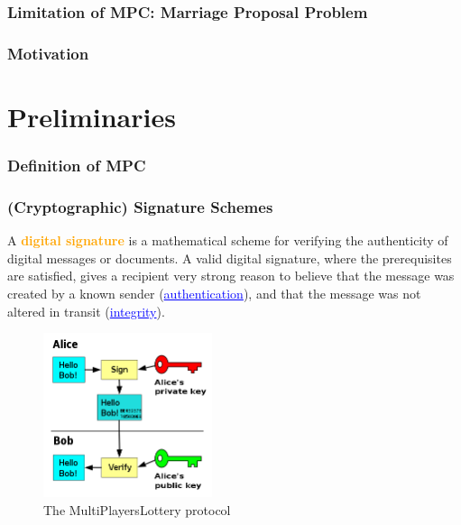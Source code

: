 \documentclass{beamer}
\begin{document}
\begin{frame}\frametitle{Limitation of MPC: Marriage Proposal Problem} 

\end{frame}


\begin{frame}\frametitle{Motivation} 
\begin{center}
\end{center}


\end{frame}


\section{Preliminaries}

\begin{frame}\frametitle{Definition of MPC} 

\end{frame}


\begin{frame}\frametitle{(Cryptographic) Signature Schemes} 
A \textcolor{orange}{\textbf{digital signature}} is a mathematical scheme for verifying the authenticity of digital messages or documents. A valid digital signature, where the prerequisites are satisfied, gives a recipient very strong reason to believe that the message was created by a known sender (\textcolor{blue}{\underline{authentication}}), and that the message was not altered in transit (\textcolor{blue}{\underline{integrity}}).
\begin{figure}
	\includegraphics[width=2.6 in, height=1.9in]{myfigs/wikipedia-signature.jpg}
	\caption{The MultiPlayersLottery protocol}
\end{figure}
\end{frame}
\end{document}
